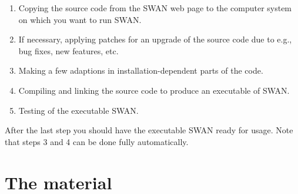 \documentclass[12pt]{book}
\begin{document}
\begin{enumerate}
   \item Copying the source code from the SWAN web page to the computer system
         on which you want to run SWAN.
   \item If necessary, applying patches for an upgrade of the source code due to
         e.g., bug fixes, new features, etc.
   \item Making a few adaptions in installation-dependent parts of the code.
   \item Compiling and linking the source code to produce an executable of SWAN.
   \item Testing of the executable SWAN.
\end{enumerate}
After the last step you should have the executable SWAN ready for usage. Note
that steps 3 and 4 can be done fully automatically.

\section{The material}
\end{document}

